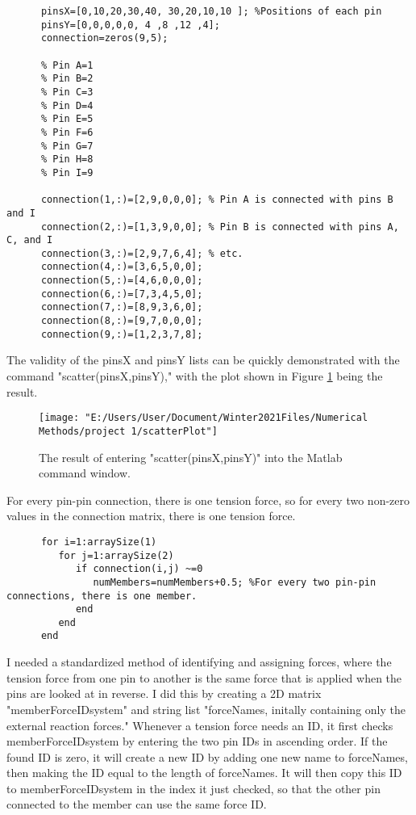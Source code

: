 \documentclass[9pt,letterpaper]{article}
\begin{document}
	  \newpage
	  \begin{verbatim}
	  pinsX=[0,10,20,30,40, 30,20,10,10 ]; %Positions of each pin
	  pinsY=[0,0,0,0,0, 4 ,8 ,12 ,4];
	  connection=zeros(9,5);
	  
	  % Pin A=1
	  % Pin B=2
	  % Pin C=3
	  % Pin D=4
	  % Pin E=5
	  % Pin F=6
	  % Pin G=7
	  % Pin H=8
	  % Pin I=9
	  
	  connection(1,:)=[2,9,0,0,0]; % Pin A is connected with pins B and I
	  connection(2,:)=[1,3,9,0,0]; % Pin B is connected with pins A, C, and I
	  connection(3,:)=[2,9,7,6,4]; % etc.
	  connection(4,:)=[3,6,5,0,0];
	  connection(5,:)=[4,6,0,0,0];
	  connection(6,:)=[7,3,4,5,0];
	  connection(7,:)=[8,9,3,6,0];
	  connection(8,:)=[9,7,0,0,0];
	  connection(9,:)=[1,2,3,7,8];
	  \end{verbatim}
	  The validity of the pinsX and pinsY lists can be quickly demonstrated with the command "scatter(pinsX,pinsY)," with the plot shown in Figure \ref{fig:scatter} being the result.
	  
	  
	 	\begin{figure}[h!]
	 	\centering
	 	\texttt{[image: "E:/Users/User/Document/Winter2021Files/Numerical Methods/project 1/scatterPlot"]}
	 	\caption{The result of entering "scatter(pinsX,pinsY)" into the Matlab command window.}
	 	\label{fig:scatter}
	 \end{figure}
 \newpage
	  
	  
	  For every pin-pin connection, there is one tension force, so for every two non-zero values in the connection matrix, there is one tension force.
	  \begin{verbatim}
	  for i=1:arraySize(1)
	     for j=1:arraySize(2)
	  	    if connection(i,j) ~=0
	  	       numMembers=numMembers+0.5; %For every two pin-pin connections, there is one member.
	        end
	     end
	  end
	  \end{verbatim}
	  I needed a standardized method of identifying and assigning forces, where the tension force from one pin to another is the same force that is applied when the pins are looked at in reverse. I did this by creating a 2D matrix "memberForceIDsystem" and string list "forceNames, initally containing only the external reaction forces." Whenever a tension force needs an ID, it first checks memberForceIDsystem by entering the two pin IDs in ascending order. If the found ID is zero, it will create a new ID by adding one new name to forceNames, then making the ID equal to the length of forceNames. It will then copy this ID to memberForceIDsystem in the index it just checked, so that the other pin connected to the member can use the same force ID.
	  
\end{document}
